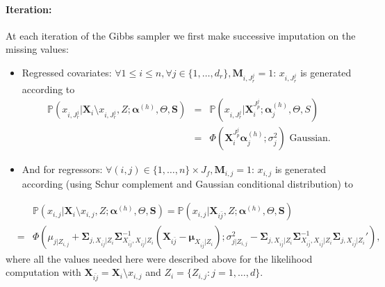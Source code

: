 \documentclass[12pt,a4paper]{report}
\begin{document}
		\paragraph{Iteration:} At each iteration of the Gibbs sampler we first make successive imputation on the missing values: \\
		\begin{itemize}
			\item Regressed covariates: $\forall 1\leq i \leq n, \forall j \in \{1,\dots,d_r \}, \boldsymbol{M}_{i,J_r^j}=1  $:  $x_{i,J_r^j}$ is generated according to 
			\begin{eqnarray}
			\mathbb{P}(x_{i,J_r^j}|\boldsymbol{X}_{i}\setminus x_{i,J_r^j},Z;\boldsymbol{\alpha}^{(h)},\Theta,\boldsymbol{S})&=&
			\mathbb{P}(x_{i,J_r^j}|\boldsymbol{X}_{i}^{J_p^j};\boldsymbol{\alpha}^{(h)}_j,\Theta,{S}) \nonumber \\
			&=&\Phi(\boldsymbol{X}_i^{J_p^j}\boldsymbol{\alpha}^{(h)}_{j};\sigma_j^2 ) \textrm{ Gaussian.} \nonumber
			\end{eqnarray}		
			\item And for regressors:
			$\forall (i,j) \in \{1,\dots,n \}\times J_f,\boldsymbol{M}_{i,j}=1$:  $x_{i,j}$ is generated according (using Schur complement and Gaussian conditional distribution) to 
						\end{itemize}		
			\begin{eqnarray}
			&&\mathbb{P}(x_{i,j}|\boldsymbol{X}_{i}\setminus x_{i,j},Z;\boldsymbol{\alpha}^{(h)},\Theta,\boldsymbol{S})=\mathbb{P}(x_{i,j}|\boldsymbol{X}_{i\bar{j}},Z;\boldsymbol{\alpha}^{(h)},\Theta,\boldsymbol{S})			\nonumber \\
			&=&\Phi(\mu_{j|Z_{i,j}} + \boldsymbol{\Sigma}_{j,X_{\bar{ij}}|Z_i}\boldsymbol{\Sigma}^{-1}_{X_{\bar{ij}},X_{\bar{ij}}|Z_i}(\boldsymbol{X}_{i\bar{j}}-\boldsymbol{\mu}_{X_{i\bar{j}}|Z_i}) ;  \sigma_{j|Z_{i,j}}^2-\boldsymbol{\Sigma}_{j,X_{i\bar{j}}|Z_i}\boldsymbol{\Sigma}^{-1}_{X_{i\bar{j}},X_{i\bar{j}}|Z_i}\boldsymbol{\Sigma}_{j,X_{i\bar{j}}|Z_i}'), \nonumber 
			\end{eqnarray}
			where all the values needed here were described above for the likelihood computation with $\boldsymbol{X}_{\bar{ij}}=\boldsymbol{X}_i\setminus x_{i,j}$ and $Z_i=\{Z_{i,j}:j=1,\dots,d \}$.\\
			
\end{document}
